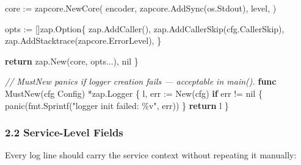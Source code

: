 \documentclass[
]{article}
\newenvironment{Shaded}{}{}
\newcommand{\BuiltInTok}[1]{\textcolor[rgb]{0.00,0.50,0.00}{#1}}
\newcommand{\CommentTok}[1]{\textcolor[rgb]{0.38,0.63,0.69}{\textit{#1}}}
\newcommand{\ControlFlowTok}[1]{\textcolor[rgb]{0.00,0.44,0.13}{\textbf{#1}}}
\newcommand{\KeywordTok}[1]{\textcolor[rgb]{0.00,0.44,0.13}{\textbf{#1}}}
\newcommand{\NormalTok}[1]{#1}
\newcommand{\OperatorTok}[1]{\textcolor[rgb]{0.40,0.40,0.40}{#1}}
\newcommand{\OtherTok}[1]{\textcolor[rgb]{0.00,0.44,0.13}{#1}}
\newcommand{\StringTok}[1]{\textcolor[rgb]{0.25,0.44,0.63}{#1}}
\begin{document}
\begin{Shaded}
\begin{Highlighting}[]
\NormalTok{    core }\OperatorTok{:=}\NormalTok{ zapcore}\OperatorTok{.}\NormalTok{NewCore}\OperatorTok{(}
\NormalTok{        encoder}\OperatorTok{,}
\NormalTok{        zapcore}\OperatorTok{.}\NormalTok{AddSync}\OperatorTok{(}\NormalTok{os}\OperatorTok{.}\NormalTok{Stdout}\OperatorTok{),}
\NormalTok{        level}\OperatorTok{,}
    \OperatorTok{)}

\NormalTok{    opts }\OperatorTok{:=} \OperatorTok{[]}\NormalTok{zap}\OperatorTok{.}\NormalTok{Option}\OperatorTok{\{}
\NormalTok{        zap}\OperatorTok{.}\NormalTok{AddCaller}\OperatorTok{(),}
\NormalTok{        zap}\OperatorTok{.}\NormalTok{AddCallerSkip}\OperatorTok{(}\NormalTok{cfg}\OperatorTok{.}\NormalTok{CallerSkip}\OperatorTok{),}
\NormalTok{        zap}\OperatorTok{.}\NormalTok{AddStacktrace}\OperatorTok{(}\NormalTok{zapcore}\OperatorTok{.}\NormalTok{ErrorLevel}\OperatorTok{),}
    \OperatorTok{\}}

    \ControlFlowTok{return}\NormalTok{ zap}\OperatorTok{.}\NormalTok{New}\OperatorTok{(}\NormalTok{core}\OperatorTok{,}\NormalTok{ opts}\OperatorTok{...),} \OtherTok{nil}
\OperatorTok{\}}

\CommentTok{// MustNew panics if logger creation fails — acceptable in main().}
\KeywordTok{func}\NormalTok{ MustNew}\OperatorTok{(}\NormalTok{cfg Config}\OperatorTok{)} \OperatorTok{*}\NormalTok{zap}\OperatorTok{.}\NormalTok{Logger }\OperatorTok{\{}
\NormalTok{    l}\OperatorTok{,}\NormalTok{ err }\OperatorTok{:=}\NormalTok{ New}\OperatorTok{(}\NormalTok{cfg}\OperatorTok{)}
    \ControlFlowTok{if}\NormalTok{ err }\OperatorTok{!=} \OtherTok{nil} \OperatorTok{\{}
        \BuiltInTok{panic}\OperatorTok{(}\NormalTok{fmt}\OperatorTok{.}\NormalTok{Sprintf}\OperatorTok{(}\StringTok{"logger init failed: \%v"}\OperatorTok{,}\NormalTok{ err}\OperatorTok{))}
    \OperatorTok{\}}
    \ControlFlowTok{return}\NormalTok{ l}
\OperatorTok{\}}
\end{Highlighting}
\end{Shaded}

\hypertarget{service-level-fields}{%
\subsubsection{2.2 Service-Level Fields}\label{service-level-fields}}

Every log line should carry the service context without repeating it
manually:
\end{document}
